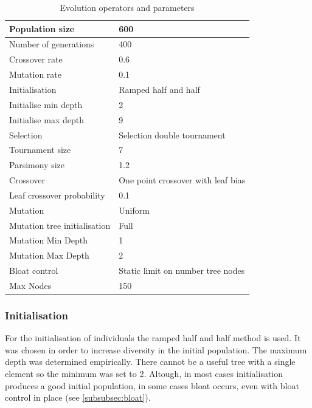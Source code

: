 \documentclass[12pt,a4paper]{article}
\begin{document}
	\begin{table}[h!]
		\centering
		\begin{tabu} to \textwidth {|X[l]|X[l]|}
			\hline
			Population size & 600 \\ \hline  
			Number of generations & 400  \\ \hline 
			Crossover rate & 0.6  \\ \hline  
			Mutation rate & 0.1  \\ \hline    \hline
			
			Initialisation & Ramped half and half \\ \hline
			Initialise min depth & 2  \\ \hline  
			Initialise max depth & 9  \\ \hline  \hline 
			
			Selection & Selection double tournament \\ \hline
			Tournament size & 7  \\ \hline  
			Parsimony size & 1.2  \\ \hline  \hline
			
			Crossover  &  One point crossover with leaf bias \\ \hline
			Leaf crossover probability & 0.1  \\ \hline
			
			Mutation & 	Uniform \\ \hline
			Mutation tree initialisation & Full \\ \hline
			Mutation Min Depth & 1  \\ \hline  
			Mutation Max Depth & 2  \\ \hline  \hline
			
			Bloat control & Static limit on number tree nodes \\ \hline
			Max Nodes & 150  \\ \hline  
		\end{tabu}
		
		\caption{Evolution operators and parameters}
		\label{table:parameters}
	\end{table}
	
	\subsubsection{Initialisation}
	For the initialisation of individuals the ramped half and half method \cite{koza_genetic_1992} is used. It was chosen in order to increase diversity in the initial population. The maximum depth was determined empirically. There cannot be a useful tree with a single element so the minimum was set to 2. Altough, in most cases initialisation produces a good initial population, in some cases bloat occurs, even with bloat control in place (see \autoref{subsubsec:bloat}).
	
\end{document}
